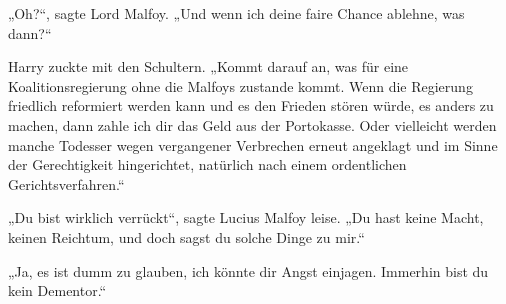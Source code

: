 „Oh?“, sagte Lord Malfoy.
„Und wenn ich deine faire Chance ablehne, was dann?“

Harry zuckte mit den Schultern.
„Kommt darauf an, was für eine Koalitionsregierung ohne die Malfoys zustande kommt. Wenn die Regierung friedlich reformiert werden kann und es den Frieden stören würde, es anders zu machen, dann zahle ich dir das Geld aus der Portokasse. Oder vielleicht werden manche Todesser wegen vergangener Verbrechen erneut angeklagt und im Sinne der Gerechtigkeit hingerichtet, natürlich nach einem ordentlichen Gerichtsverfahren.“

„Du bist wirklich verrückt“, sagte Lucius Malfoy leise.
„Du hast keine Macht, keinen Reichtum, und doch sagst du solche Dinge zu mir.“

„Ja, es ist dumm zu glauben, ich könnte dir Angst einjagen. Immerhin bist du kein Dementor.“

